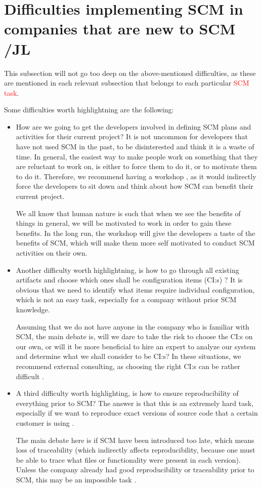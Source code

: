 \documentclass[10pt]{article}
\newcommand\remove[1]{\textcolor{red}{#1}}
\begin{document}
\section{Difficulties implementing SCM in companies that are new to SCM /JL}
This subsection will not go too deep on the above-mentioned difficulties, as these are mentioned in each relevant subsection that belongs to each particular \remove{SCM task}.

Some difficulties worth highlightning are the following:
\begin{itemize}
\item How are we going to get the developers involved in defining SCM plans and activities for their current project? It is not uncommon for developers that have not used SCM in the past, to be disinterested and think it is a waste of time. In general, the easiest way to make people work on something that they are reluctant to work on, is either to force them to do it, or to motivate them to do it. Therefore, we recommend having a workshop \cite{Vinter}, as it would indirectly force the developers to sit down and think about how SCM can benefit their current project. 

\noindent{}We all know that human nature is such that when we see the benefits of things in general, we will be motivated to work in order to gain these benefits. In the long run, the workshop will give the developers a taste of the benefits of SCM, which will make them more self motivated to conduct SCM activities on their own. 

\item Another difficulty worth highlightning, is how to go through all existing artifacts and choose which ones shall be configuration items (CI:s) \cite{Kelly2}? It is obvious that we need to identify what items require individual configuration, which is not an easy task, especially for a company without prior SCM knowledge. 

\noindent{}Assuming that we do not have anyone in the company who is familiar with SCM, the main debate is, will we dare to take the risk to choose the CI:s on our own, or will it be more beneficial to hire an expert to analyze our system and determine what we shall consider to be CI:s? In these situations, we recommend external consulting, as choosing the right CI:s can be rather difficult \cite{Daniels3}\cite{Kelly2}.

\item A third difficulty worth highlighting, is how to ensure reproducibility of everything prior to SCM? The answer is that this is an extremely hard task, especially if we want to reproduce exact versions of source code that a certain customer is using \cite{Appleton2}.

\noindent{}The main debate here is if SCM have been introduced too late, which means loss of traceability \cite{Kelly} (which indirectly affects reproducibility, because one must be able to trace what files or functionality were present in each version). Unless the company already had good reproducibility or traceability prior to SCM, this may be an impossible task \cite{Bays}. 

\end{itemize}
\end{document}
